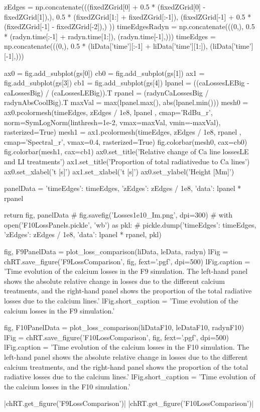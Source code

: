 \begin{pycode}[TimeDepRT]
    zEdges = np.concatenate(((fixedZGrid[0] + 0.5 * (fixedZGrid[0] - fixedZGrid[1]),),
                    0.5 * (fixedZGrid[1:] + fixedZGrid[:-1]),
                    (fixedZGrid[-1] + 0.5 * (fixedZGrid[-1] - fixedZGrid[-2]),)
                   ))
    timeEdgesRadyn = np.concatenate(((0,), 0.5 * (radyn.time[:-1] + radyn.time[1:]), (radyn.time[-1],)))
    timeEdges = np.concatenate(((0,), 0.5 * (liData['time'][:-1] + liData['time'][1:]), (liData['time'][-1],)))

    ax0 = fig.add_subplot(gs[0])
    cb0 = fig.add_subplot(gs[1])
    ax1 = fig.add_subplot(gs[3])
    cb1 = fig.add_subplot(gs[4])
    lpanel = ((caLossesLEBig - caLossesBig) / (caLossesLEBig)).T
    rpanel = (radynCaLossesBig / radynAbsCoolBig).T
    maxVal = max(lpanel.max(), abs(lpanel.min()))
    mesh0 = ax0.pcolormesh(timeEdges, zEdges / 1e8,
                           lpanel
                           , cmap='RdBu_r', norm=SymLogNorm(linthresh=1e-2, vmax=maxVal, vmin=-maxVal),
                           rasterized=True)
    mesh1 = ax1.pcolormesh(timeEdges, zEdges / 1e8,
                           rpanel
                           , cmap='Spectral_r', vmax=0.4,
                           rasterized=True)
    fig.colorbar(mesh0, cax=cb0)
    fig.colorbar(mesh1, cax=cb1)
    ax0.set_title('Relative change of Ca line losses\nwith LE and LI treatments')
    ax1.set_title('Proportion of total radiative\nlosses due to Ca lines')
    ax0.set_xlabel('t [s]')
    ax1.set_xlabel('t [s]')
    ax0.set_ylabel('Height [Mm]')

    panelData = {'timeEdges': timeEdges, 'zEdges': zEdges / 1e8, 'data': lpanel * rpanel}

    return fig, panelData
    # fig.savefig('Losses1e10_Im.png', dpi=300)
    # with open('F10LossPanels.pickle', 'wb') as pkl:
    #     pickle.dump({'timeEdges': timeEdges, 'zEdges': zEdges / 1e8, 'data': lpanel * rpanel}, pkl)

fig, F9PanelData = plot_loss_comparison(liData, leData, radyn)
lFig = chRT.save_figure('F9LossComparison', fig, fext='.pgf', dpi=500)
lFig.caption = 'Time evolution of the calcium losses in the F9 simulation. The left-hand panel shows the absolute relative change in losses due to the different calcium treatments, and the right-hand panel shows the proportion of the total radiative losses due to the calcium lines.'
lFig.short_caption = 'Time evolution of the calcium losses in the F9 simulation.'

fig, F10PanelData = plot_loss_comparison(liDataF10, leDataF10, radynF10)
lFig = chRT.save_figure('F10LossComparison', fig, fext='.pgf', dpi=500)
lFig.caption = 'Time evolution of the calcium losses in the F10 simulation. The left-hand panel shows the absolute relative change in losses due to the different calcium treatments, and the right-hand panel shows the proportion of the total radiative losses due to the calcium lines.'
lFig.short_caption = 'Time evolution of the calcium losses in the F10 simulation.'
\end{pycode}
\py[TimeDepRT]|chRT.get_figure('F9LossComparison')|
\py[TimeDepRT]|chRT.get_figure('F10LossComparison')|

